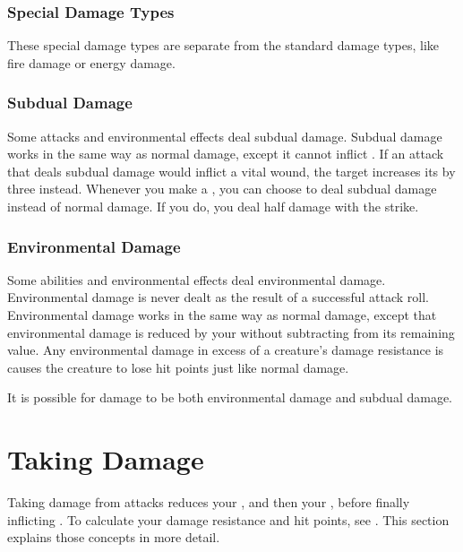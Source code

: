     \subsubsection{Special Damage Types}\label{Special Damage Types}

        These special damage types are separate from the standard damage types, like fire damage or energy damage.

        \subsubsection{Subdual Damage}\label{Subdual Damage}
            Some attacks and environmental effects deal subdual damage.
            Subdual damage works in the same way as normal damage, except it cannot inflict .
            If an attack that deals subdual damage would inflict a vital wound, the target increases its  by three instead.
            Whenever you make a , you can choose to deal subdual damage instead of normal damage.
            If you do, you deal half damage with the strike.

        \subsubsection{Environmental Damage}\label{Environmental Damage}
            Some abilities and environmental effects deal environmental damage.
            Environmental damage is never dealt as the result of a successful attack roll.
            Environmental damage works in the same way as normal damage, except that environmental damage is reduced by your  without subtracting from its remaining value.
            Any environmental damage in excess of a creature's damage resistance is causes the creature to lose hit points just like normal damage.

            It is possible for damage to be both environmental damage and subdual damage.

\section{Taking Damage}\label{Taking Damage}
    Taking damage from attacks reduces your , and then your , before finally inflicting .
    To calculate your damage resistance and hit points, see .
    This section explains those concepts in more detail.

